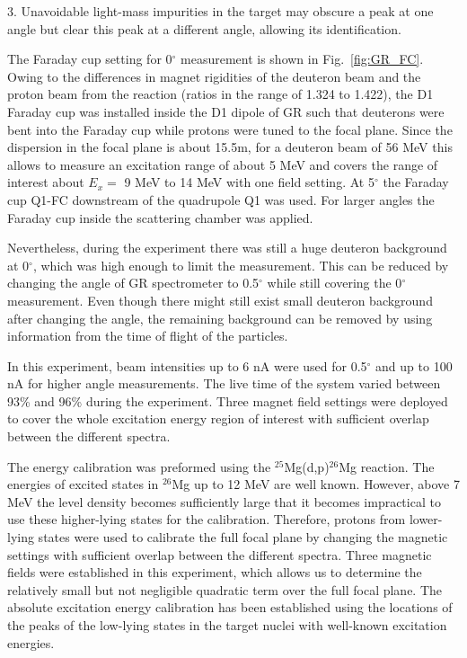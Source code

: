 3. Unavoidable light-mass impurities in the target may obscure a peak at one angle but clear this peak at a different angle, allowing its identification.

The Faraday cup setting for 0$^{\circ}$ measurement is shown in Fig.~\ref{fig:GR_FC}. Owing to the differences in magnet rigidities of the deuteron beam and the proton beam from the reaction (ratios in the range of 1.324  to 1.422), the D1 Faraday cup was installed inside the D1 dipole of GR such that deuterons were bent into the Faraday cup while protons were tuned to the focal plane. Since the dispersion in the focal plane is about 15.5m, for a deuteron beam of 56 MeV this allows to measure an excitation range of about 5 MeV and covers the range of interest  about $E_x=$ 9 MeV to 14 MeV with one field setting. At 5$^{\circ}$  the Faraday cup Q1-FC downstream of the quadrupole Q1 was used. For larger angles the Faraday cup inside the scattering chamber was applied.

Nevertheless,  during the experiment there was still a huge deuteron background at 0$^{\circ}$, which was high enough to limit the measurement. This  can be reduced by changing the angle of GR spectrometer to 0.5$^{\circ}$ while still covering the 0$^{\circ}$ measurement. Even though there might still exist  small deuteron background after changing the angle, the remaining background can be removed by using information from the time of flight of the particles.

In this experiment, beam intensities up to 6 nA were used for 0.5$^{\circ}$ and up to 100 nA for higher angle measurements. The live time of the system varied between 93\% and 96\% during the experiment. Three magnet field settings were deployed to cover the whole excitation energy region of interest with sufficient overlap between the different spectra.

The energy calibration was preformed using the $^{25}$Mg(d,p)$^{26}$Mg reaction. The energies of excited states in $^{26}$Mg up to 12 MeV are well known. However, above 7 MeV the level density becomes sufficiently large that it becomes impractical to use these higher-lying states for the calibration. Therefore, protons from lower-lying states were used to calibrate the full focal plane by changing the magnetic settings with sufficient overlap between the different spectra. Three magnetic fields were established in this experiment, which allows us to determine the relatively small but not negligible quadratic term over the full focal plane.  The absolute excitation energy calibration has been  established using the locations of the peaks of the low-lying states in the target nuclei with well-known excitation energies.



